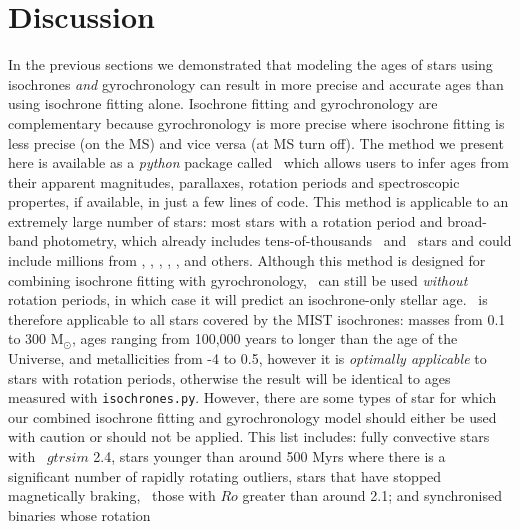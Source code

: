 \section{Discussion}
\label{section:discussion}

In the previous sections we demonstrated that modeling the ages of stars using
isochrones {\it and} gyrochronology can result in more precise and accurate
ages than using isochrone fitting alone.
Isochrone fitting and gyrochronology are  complementary because gyrochronology
is more precise where isochrone fitting is less precise (on the MS) and vice
versa (at MS turn off).
The method we present here is available as a {\it python} package called \sd\
which allows users to infer ages from their apparent magnitudes, parallaxes,
rotation periods and spectroscopic propertes, if available, in just a few
lines of code.
This method is applicable to an extremely large number of stars: most stars
with a rotation period and broad-band photometry, which already includes
tens-of-thousands \kepler\ and \ktwo\ stars and could include millions from
\tess, \lsst, \wfirst, \plato, \gaia, and others.
Although this method is designed for combining isochrone fitting with
gyrochronology, \sd\ can still be used {\it without} rotation periods, in
which case it will predict an isochrone-only stellar age.
\sd\ is therefore applicable to all stars covered by the MIST isochrones:
masses from 0.1 to 300 M$_\odot$, ages ranging from 100,000 years to longer
than the age of the Universe, and metallicities from -4 to 0.5, however it is
{\it optimally applicable} to stars with rotation periods, otherwise the
result will be identical to ages measured with {\tt isochrones.py}.
However, there are some types of star for which our combined isochrone fitting
and gyrochronology model should either be used with caution or should not be
applied.
This list includes: fully convective stars with \gcolor\ $gtrsim$ 2.4, stars
younger than around 500 Myrs where there is a significant number of rapidly
rotating outliers, stars that have stopped magnetically braking, \ie\ those
with $Ro$ greater than around 2.1; and synchronised binaries whose rotation
